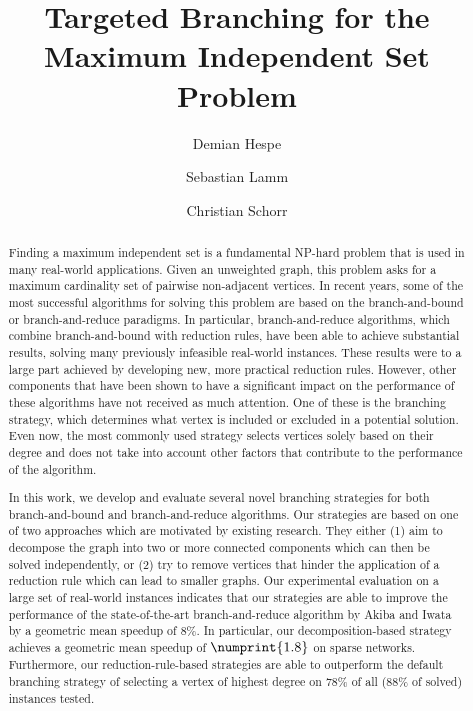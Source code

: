 \documentclass[a4paper,UKenglish,cleveref, autoref, thm-restate]{lipics-v2021}
\title{Targeted Branching for the Maximum Independent Set Problem} %
\author{Demian Hespe}{Karlsruhe Institute of Technology, Institute for
  Theoretical Informatics,
  Germany}{hespe@kit.edu}{https://orcid.org/0000-0001-6232-2951}{\todo{Add
    funding}}
\author{Sebastian Lamm}{Karlsruhe Institute of Technology, Institute for
  Theoretical Informatics, Germany}{lamm@kit.edu}{}{\todo{Add funding}}
\author{Christian Schorr}{Karlsruhe Institute of Technology, Institute for
  Theoretical Informatics, Germany}{christian.schorr@student.kit.edu}{}{}
\begin{document}
\maketitle

\begin{abstract}
  Finding a maximum independent set is a fundamental NP-hard problem that is used in many real-world applications.
Given an unweighted graph, this problem asks for a maximum cardinality set of pairwise non-adjacent vertices.
In recent years, some of the most successful algorithms for solving this problem are based on the branch-and-bound or branch-and-reduce paradigms.
In particular, branch-and-reduce algorithms, which combine branch-and-bound with reduction rules, have been able to achieve substantial results, solving many previously infeasible real-world instances.
These results were to a large part achieved by developing new, more practical reduction rules.
However, other components that have been shown to have a significant impact on the performance of these algorithms have not received as much attention.
One of these is the branching strategy, which determines what vertex is included or excluded in a potential solution.
Even now, the most commonly used strategy selects vertices solely based on their degree and does not take into account other factors that contribute to the performance of the algorithm.

In this work, we develop and evaluate several novel branching strategies for both branch-and-bound and branch-and-reduce algorithms.
Our strategies are based on one of two approaches which are motivated by existing research. 
They either (1) aim to decompose the graph into two or more connected components which can then be solved independently, or (2) try to remove vertices that hinder the application of a reduction rule which can lead to smaller graphs.
Our experimental evaluation on a large set of real-world instances indicates
that our strategies are able to improve the performance of the state-of-the-art
branch-and-reduce algorithm by Akiba and Iwata by a geometric mean speedup of $8\%$. In particular, our
decomposition-based strategy achieves a geometric mean speedup of $\numprint{1.8}$ on sparse networks.
Furthermore, our reduction-rule-based strategies are able to outperform the
default branching strategy of selecting a vertex of highest degree on $78\%$ of all
($88\%$ of solved)
instances tested.

\end{abstract}
\end{document}

